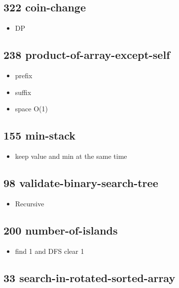 \subsection{322 coin-change}

\begin{itemize}
	\item DP
\end{itemize}

\subsection{238 product-of-array-except-self}

\begin{itemize}
	\item prefix
	\item suffix
	\item space O(1)
\end{itemize}

\subsection{155 min-stack}

\begin{itemize}
	\item keep value and min at the same time
\end{itemize}

\subsection{98 validate-binary-search-tree}

\begin{itemize}
	\item Recursive
\end{itemize}

\subsection{200 number-of-islands}

\begin{itemize}
	\item find 1 and DFS clear 1
\end{itemize}

\subsection{33 search-in-rotated-sorted-array}

